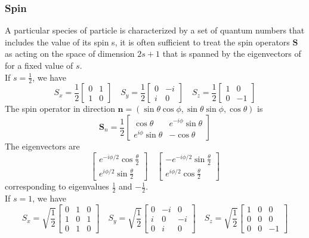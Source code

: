 \subsubsection{Spin}
A particular species of particle is characterized by a set of quantum numbers that includes the value of its spin s, it is often sufficient to treat the spin operators $\bm{S}$ as acting on the space of dimension
$2s+1$ that is spanned by the eigenvectors of for a fixed value of $s$. \\
If $s= \frac{1}{2}$, we have
\[S_x = \frac{1}{2} \left[ \begin{matrix} 0& 1\\ 1& 0\end{matrix} \right] \quad S_y = \frac{1}{2} \left[ \begin{matrix} 0& -i\\ i& 0\end{matrix} \right] \quad S_z = \frac{1}{2} \left[ \begin{matrix} 1& 0\\ 0& -1\end{matrix} \right]\]
The spin operator in direction $\bm{n} = (\sin\theta\cos\phi,\sin\theta\sin\phi,\cos\theta)$ is
\[\bm{S}_{n} = \frac{1}{2} \left[ \begin{matrix} \cos\theta& e^{-i\phi}\sin\theta\\ e^{i\phi}\sin\theta& -\cos\theta\end{matrix} \right]\]
The eigenvectors are
\[\left[ \begin{matrix} e^{-i\phi/2}\cos\frac{\theta}{2}\\ e^{i\phi/2}\sin\frac{\theta}{2} \end{matrix} \right] \quad \left[ \begin{matrix} -e^{-i\phi/2}\sin\frac{\theta}{2}\\ e^{i\phi/2}\cos\frac{\theta}{2} \end{matrix} \right]\]
corresponding to eigenvalues $\frac{1}{2}$ and $-\frac{1}{2}$.\\
If $s= 1$, we have
\[S_x = \sqrt{\frac{1}{2}} \left[ \begin{matrix} 0& 1& 0\\ 1& 0& 1\\ 0& 1& 0\end{matrix} \right]  \quad S_y = \sqrt{\frac{1}{2}} \left[ \begin{matrix} 0& -i& 0\\ i& 0& -i\\ 0& i& 0\end{matrix} \right] \quad S_z = \sqrt{\frac{1}{2}} \left[ \begin{matrix} 1& 0& 0\\ 0& 0& 0\\ 0& 0& -1\end{matrix} \right]\]
